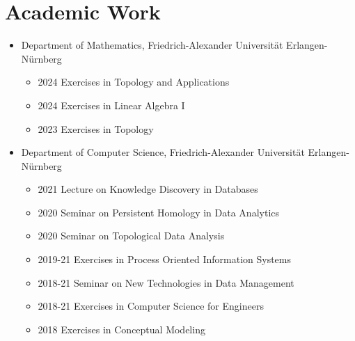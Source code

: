 \documentclass[a4paper, 12pt]{article}
\newcommand{\years}[1]{\marginnote{\scriptsize #1}}
\begin{document}
	\newpage
	\section*{Academic Work}
	\years{Teaching}
	\vspace{-2pt}
	\begin{itemize}[noitemsep, leftmargin=*]
		\item Department of Mathematics, Friedrich-Alexander Universität Erlangen-Nürnberg
			\begin{itemize}
				\item 2024 Exercises in Topology and Applications
				\item 2024 Exercises in Linear Algebra I
				\item 2023 Exercises in Topology
			\end{itemize}
		\item Department of Computer Science, Friedrich-Alexander Universität Erlangen-Nürnberg
			\begin{itemize}
				\item 2021 Lecture on Knowledge Discovery in Databases
				\item 2020 Seminar on Persistent Homology in Data Analytics
				\item 2020 Seminar on Topological Data Analysis
				\item 2019-21 Exercises in Process Oriented Information Systems
				\item 2018-21 Seminar on New Technologies in Data Management
				\item 2018-21 Exercises in Computer Science for Engineers
				\item 2018 Exercises in Conceptual Modeling
			\end{itemize}
	\end{itemize}
	\vspace{10pt}
\end{document}

